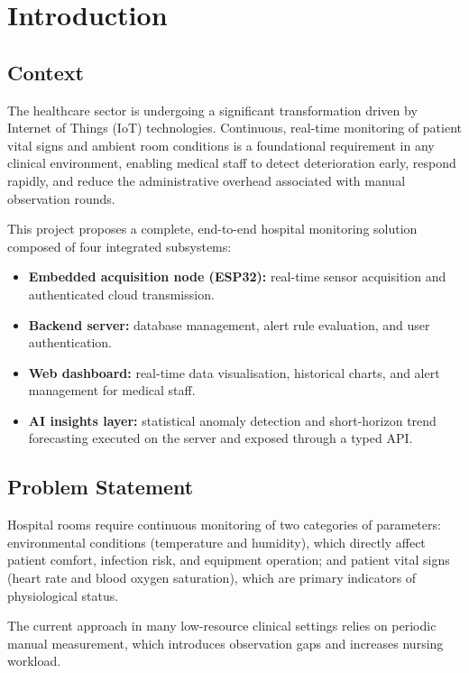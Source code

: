 \chapter{Introduction}

\section{Context}

The healthcare sector is undergoing a significant transformation driven by Internet of Things (IoT) technologies.
Continuous, real-time monitoring of patient vital signs and ambient room conditions is a foundational requirement in any clinical environment, enabling medical staff to detect deterioration early, respond rapidly, and reduce the administrative overhead associated with manual observation rounds.

This project proposes a complete, end-to-end hospital monitoring solution composed
of four integrated subsystems:

\begin{itemize}
	\item \textbf{Embedded acquisition node (ESP32):} real-time sensor acquisition and authenticated cloud transmission.\cite{esp32_datasheet,dht22_datasheet,max30102_datasheet}
	\item \textbf{Backend server:} database management, alert rule evaluation, and
	      user authentication.
	\item \textbf{Web dashboard:} real-time data visualisation, historical charts,
	      and alert management for medical staff.
	\item \textbf{AI insights layer:} statistical anomaly detection and short-horizon
	      trend forecasting executed on the server and exposed through a typed API.
\end{itemize}

\section{Problem Statement}

Hospital rooms require continuous monitoring of two categories of parameters:
environmental conditions (temperature and humidity), which directly affect patient
comfort, infection risk, and equipment operation; and patient vital signs (heart rate
and blood oxygen saturation), which are primary indicators of physiological status.

The current approach in many low-resource clinical settings relies on periodic manual
measurement, which introduces observation gaps and increases nursing workload.

